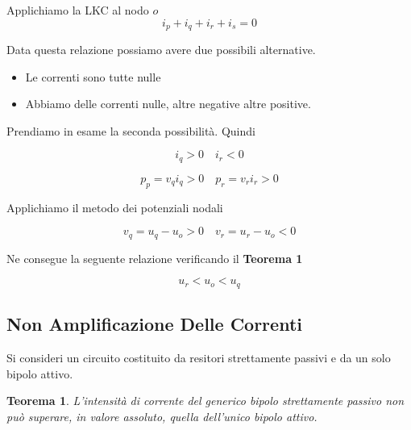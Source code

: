 \documentclass[a4paper]{report}
\newtheorem{definizione}{Teorema}
\begin{document}
Applichiamo la LKC al nodo $o$
\[
i_p+i_q+i_r+i_s=0
\]

Data questa relazione possiamo avere due possibili alternative.

\begin{itemize}
\item Le correnti sono tutte nulle
\item Abbiamo delle correnti nulle, altre negative altre positive.
\end{itemize}

Prendiamo in esame la seconda possibilit\`a. Quindi

\[
i_q>0 \quad i_r<0
\]

\[
p_p=v_qi_q>0 \quad p_r=v_ri_r>0
\]

Applichiamo il metodo dei potenziali nodali

\[
v_q=u_q-u_o>0 \quad v_r=u_r-u_o<0
\]

Ne consegue la seguente relazione verificando il {\bf Teorema 1}

\[
u_r<u_o<u_q
\]

\subsection{Non Amplificazione Delle Correnti}
\label{subsec:nonAmplC}
Si consideri un circuito costituito da resitori strettamente passivi e
da un solo bipolo attivo.
\begin{definizione}
  L'intensit\`a di corrente del generico bipolo strettamente passivo
  non pu\`o superare, in valore assoluto, quella dell'unico bipolo attivo.
\end{definizione}
\end{document}

